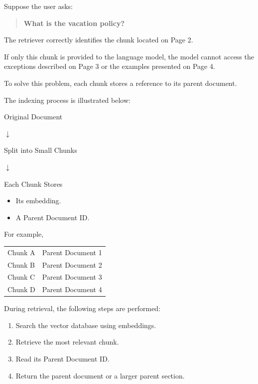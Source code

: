 Suppose the user asks:

\begin{quote}
\textbf{What is the vacation policy?}
\end{quote}

The retriever correctly identifies the chunk located on Page 2.

If only this chunk is provided to the language model, the model cannot access the exceptions described on Page 3 or the examples presented on Page 4.

To solve this problem, each chunk stores a reference to its parent document.

The indexing process is illustrated below:
\clearpage
\begin{center}
Original Document

$\downarrow$

Split into Small Chunks

$\downarrow$

Each Chunk Stores

\begin{itemize}
    \item Its embedding.
    \item A Parent Document ID.
\end{itemize}
\end{center}

For example,

\begin{center}
\begin{tabular}{ll}
Chunk A & Parent Document 1 \\
Chunk B & Parent Document 2 \\
Chunk C & Parent Document 3 \\
Chunk D & Parent Document 4 \\
\end{tabular}
\end{center}

During retrieval, the following steps are performed:

\begin{enumerate}
    \item Search the vector database using embeddings.
    \item Retrieve the most relevant chunk.
    \item Read its Parent Document ID.
    \item Return the parent document or a larger parent section.
\end{enumerate}

